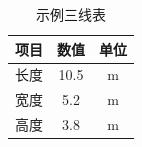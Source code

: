 \documentclass{article}
\begin{document}
\begin{table}[htbp]
  \centering
  \caption{示例三线表}
  \label{tab:example}
  \begin{tabular}{lcc}
    \toprule
    项目 & 数值 & 单位 \\
    \midrule
    长度 & 10.5 & m \\
    宽度 & 5.2  & m \\
    高度 & 3.8  & m \\
    \bottomrule
  \end{tabular}
\end{table}
\end{document}
